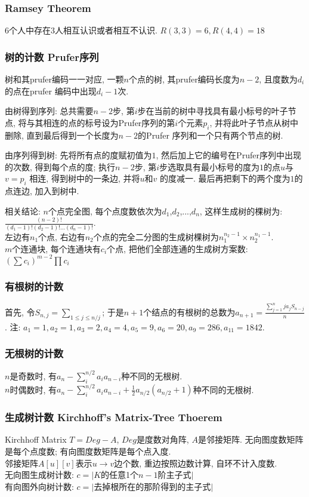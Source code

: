 \subsubsection{Ramsey Theorem}
    $6$个人中存在$3$人相互认识或者相互不认识. $R(3,3)=6, R(4,4)=18$

\subsubsection{树的计数 Prufer序列}
    树和其prufer编码一一对应, 一颗$n$个点的树, 其prufer编码长度为${n-2}$, 且度数为$d_i$ 的点在prufer 编码中出现${d_i -1}$次. 
    \par 由树得到序列: 总共需要$n-2$步, 第$i$步在当前的树中寻找具有最小标号的叶子节点, 将与其相连的点的标号设为Prufer序列的第$i$个元素$p_i$, 并将此叶子节点从树中删除, 直到最后得到一个长度为$n-2$的Prufer 序列和一个只有两个节点的树. 
    \par 由序列得到树: 先将所有点的度赋初值为$1$, 然后加上它的编号在Prufer序列中出现的次数, 得到每个点的度; 执行$n-2$步, 第$i$步选取具有最小标号的度为$1$的点$u$与$v=p_i$ 相连, 得到树中的一条边, 并将$u$和$v$ 的度减一. 最后再把剩下的两个度为$1$的点连边, 加入到树中. 
    \par 相关结论: $n$个点完全图, 每个点度数依次为$d_1$,$d_2$,...,$d_n$, 这样生成树的棵树为: ${\frac{(n-2)!}{(d_1-1)!(d_2-1)!...(d_n-1)!}}$.\\
    左边有$n_1$个点, 右边有$n_2$个点的完全二分图的生成树棵树为$n_1^{n_2-1}\times n_2^{n_1-1}$. \\
    $m$个连通块, 每个连通块有$c_i$个点, 把他们全部连通的生成树方案数: $(\sum c_i)^{m-2}\prod c_i$
\subsubsection{有根树的计数}\noindent
    首先, 令$S_{n,j}=\sum_{1\leq j\leq n/j}$; 于是$n+1$个结点的有根树的总数为$ a_{n+1}=\frac{\sum_{j=1}^nja_jS_{n-j}}{n}$. 注: $a_1=1,a_2=1,a_3=2,a_4=4,a_5=9,a_6=20,a_9=286,a_{11}=1842$. 
\subsubsection{无根树的计数}\noindent
    $n$是奇数时, 有$a_n-\sum_{i}^{n/2}a_ia_{n-i}$种不同的无根树. \\
    $n$时偶数时, 有$a_n-\sum_{i}^{n/2}a_ia_{n-i}+\frac{1}{2}a_{n/2}(a_{n/2}+1)$种不同的无根树. 
\subsubsection{生成树计数 Kirchhoff's Matrix-Tree Thoerem}
    Kirchhoff Matrix $T=Deg-A$, $Deg$是度数对角阵, $A$是邻接矩阵. 无向图度数矩阵是每个点度数; 有向图度数矩阵是每个点入度.\\
    邻接矩阵$A[u][v]$表示$u\rightarrow v$边个数, 重边按照边数计算, 自环不计入度数.\\
    无向图生成树计数: $c=|K$的任意1个$n−1$阶主子式$|$\\
    有向图外向树计数: $c=|$去掉根所在的那阶得到的主子式$|$
